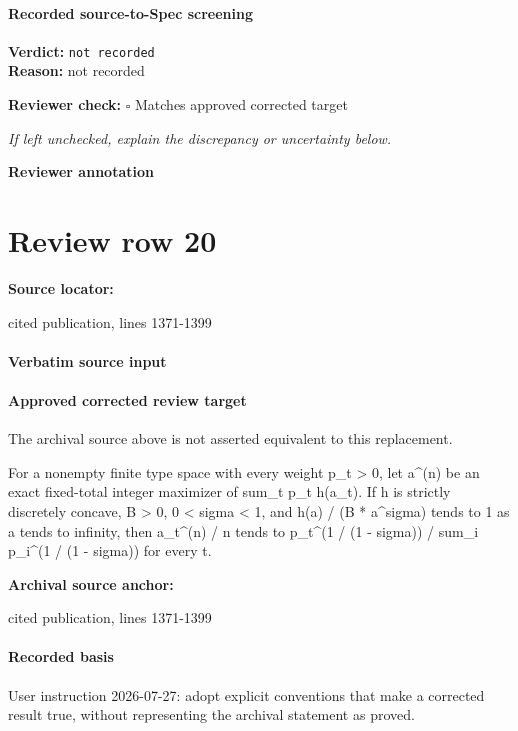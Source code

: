 \documentclass[10pt]{article}
\newcommand{\reviewerbox}{%
  \par\noindent\fbox{\parbox{0.96\linewidth}{\rule{0pt}{0.38in}}}\par
}
\newcommand{\reviewmatch}[1]{%
  \par\noindent\textbf{Reviewer check:} $\square$\; #1\par
  \noindent\emph{If left unchecked, explain the discrepancy or uncertainty below.}\par
}
\begin{document}
\paragraph{Recorded source-to-Spec screening}
\textbf{Verdict:} \texttt{not recorded}
\\
\textbf{Reason:} not recorded
\reviewmatch{Matches approved corrected target}
\noindent\textbf{Reviewer annotation}\par
\reviewerbox
\clearpage
\hypertarget{source-claim-30cff96f226dc581}{}
\section*{Review row 20}
\textbf{Source locator:} {\footnotesize\raggedright cited publication, lines 1371-\allowbreak{}1399\par}
\paragraph{Verbatim source input}
\begin{ReviewVerbatim}
\end{ReviewVerbatim}

\paragraph{Approved corrected review target}
The archival source above is not asserted equivalent to this replacement.
\begin{ReviewVerbatim}
For a nonempty finite type space with every weight p_t > 0, let a^(n) be an exact fixed-total integer maximizer of sum_t p_t h(a_t). If h is strictly discretely concave, B > 0, 0 < sigma < 1, and h(a) / (B * a^sigma) tends to 1 as a tends to infinity, then a_t^(n) / n tends to p_t^(1 / (1 - sigma)) / sum_i p_i^(1 / (1 - sigma)) for every t.
\end{ReviewVerbatim}

\textbf{Archival source anchor:} {\footnotesize\raggedright cited publication, lines 1371-\allowbreak{}1399\par}
\paragraph{Recorded basis}
User instruction 2026-\allowbreak{}07-\allowbreak{}27:\allowbreak{} adopt explicit conventions that make a corrected result true, without representing the archival statement as proved.\allowbreak{}
\end{document}
